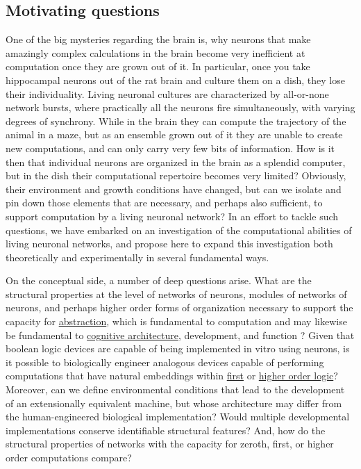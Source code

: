 \subsection{Motivating questions}
\label{sec:questions}
One of the big mysteries regarding the brain is, why neurons that make amazingly complex calculations in the brain become very inefficient at computation once they are grown out of it. In particular, once you take hippocampal neurons out of the rat brain and culture them on a dish, they lose their individuality. Living neuronal cultures are characterized by all-or-none network bursts, where practically all the neurons fire simultaneously, with varying degrees of synchrony. While in the brain they can compute the trajectory of the animal in a maze, but as an ensemble grown out of it they are unable to create new computations, and can only carry very few bits of information. How is it then that individual neurons are organized in the brain as a splendid computer, but in the dish their computational repertoire becomes very limited? Obviously, their environment and growth conditions have changed, but can we isolate and pin down those elements that are necessary, and perhaps also sufficient, to support computation by a living neuronal network? In an effort to tackle such questions, we have embarked on an investigation of the computational abilities of living neuronal networks, and propose here to expand this investigation both theoretically and experimentally in several fundamental ways.

On the conceptual side, a number of deep questions arise. What are the structural properties at the level of networks of neurons,
modules of networks of neurons, and perhaps higher order forms of
organization necessary to support the capacity for
\href{http://en.wikipedia.org/wiki/Metalinguistic\_abstraction}{abstraction},
which is fundamental to computation and may likewise be fundamental to
\href{http://en.wikipedia.org/wiki/Cognitive\_architecture}{cognitive
architecture}, development, and function \cite{Tenenbaum2011}? Given that boolean
logic devices are capable of being implemented in vitro using
neurons\cite{Feinerman2008}, is it possible to biologically engineer analogous
devices capable of performing computations that have natural embeddings
within \href{http://en.wikipedia.org/wiki/First-order\_logic}{first} or
\href{http://en.wikipedia.org/wiki/Higher\_order\_logic}{higher order
logic}? Moreover, can we define environmental conditions that lead to
the development of an extensionally equivalent machine, but whose
architecture may differ from the human-engineered biological
implementation? Would multiple developmental implementations conserve
identifiable structural features? And, how do the structural properties
of networks with the capacity for zeroth, first, or higher order
computations compare?

